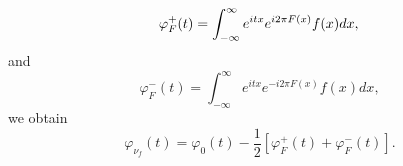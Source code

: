 \documentclass[sn-mathphys-num]{sn-jnl}%
\theoremstyle{thmstyleone}%
\theoremstyle{thmstyletwo}%
\theoremstyle{thmstylethree}%
\begin{document}
\begin{equation}
	\varphi_F^{+}(t) =\int_{-\infty}^{\infty} e^{i t x} e^{i 2 \pi F(x)} f(x) d x, \\
\end{equation}	
and
\begin{equation}
	\varphi_F^{-}(t) =\int_{-\infty}^{\infty} e^{i t x} e^{-i 2 \pi F(x)} f(x) d x,
\end{equation}
we obtain
\begin{equation}
	\varphi_{\nu_f}(t)=\varphi_0(t)-\frac{1}{2}\left[\varphi_F^{+}(t)+\varphi_F^{-}(t)\right].
\end{equation}		








\newpage
\end{document}
